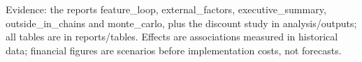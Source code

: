 \documentclass[10pt]{article}
\begin{document}
\vspace{2pt}
{\small\color{gray}Evidence: the reports feature\_loop, external\_factors, executive\_summary, outside\_in\_chains and monte\_carlo, plus the discount study in analysis/outputs; all tables are in reports/tables. Effects are associations measured in historical data; financial figures are scenarios before implementation costs, not forecasts.}
\end{document}
